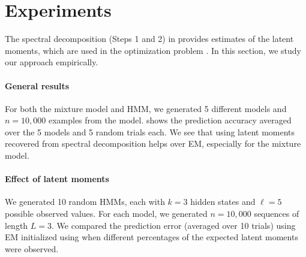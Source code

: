 \section{Experiments}
\label{sec:experiments}

The spectral decomposition (Steps 1 and 2) in 
provides estimates of the latent moments,
which are used in the optimization problem .
In this section, we study our approach empirically.

\paragraph{General results}

For both the mixture model and HMM,
we generated 5 different models and $n=10,000$ examples from the model.
 shows the prediction accuracy averaged over the 5 models and 5
random trials each.
We see that using latent moments recovered from spectral decomposition
helps over EM, especially for the mixture model.

\paragraph{Effect of latent moments}

We generated 10 random HMMs,
each with $k=3$ hidden states and $\ell=5$ possible observed values. 
For each model, we generated $n=10,000$ sequences of length $L=3$.
We compared the prediction error (averaged over 10 trials) using EM
initialized using  when different percentages of the expected
latent moments were observed.


